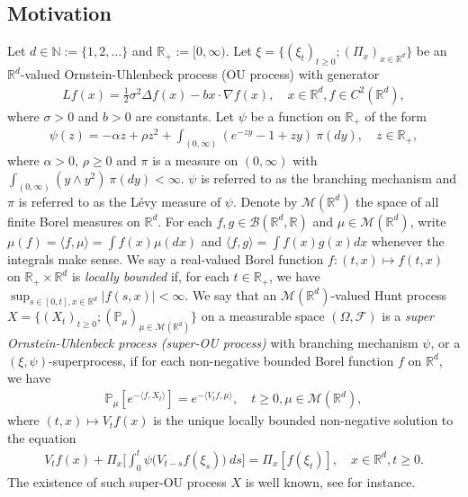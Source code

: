 \documentclass[12pt,a4paper]{amsart}
\theoremstyle{plain}
\theoremstyle{definition}
\numberwithin{equation}{section}
\begin{document}
\subsection{Motivation}
\label{subsec:M}
Let $d \in \mathbb N:= \{1,2,\dots\}$ and $\mathbb R_+:= [0,\infty)$.
Let $\xi=\{(\xi_t)_{t\geq 0}; (\Pi_x)_{x\in \mathbb R^d}\}$ be an $\mathbb R^d$-valued Ornstein-Uhlenbeck process (OU process) with generator
\begin{align}
  Lf(x)
  = \frac{1}{2}\sigma^2\Delta f(x)-b x \cdot \nabla f(x)
  , \quad  x\in \mathbb R^d, f \in C^2(\mathbb R^d),
\end{align}
where $\sigma > 0$ and $b > 0$ are constants.
Let $\psi$ be a function on $\mathbb R_+$ of the form
\begin{align}
  \label{eq: honogeneou branching mechanism}
  \psi(z)
  =- \alpha z + \rho z^2 + \int_{(0,\infty)} (e^{-zy} - 1 + zy)~\pi(dy)
  , \quad  z \in \mathbb R_+,
\end{align}
where $\alpha > 0 $, $\rho \geq0$ and $\pi$ is a measure on $(0,\infty)$ with $\int_{(0,\infty)}(y\wedge y^2)~\pi(dy)< \infty$.
$\psi$ is referred to as the branching mechanism and $\pi$ is referred to as the L\'evy measure of $\psi$.
Denote by $\mathcal M(\mathbb R^d)$ the space of all finite Borel measures on $\mathbb R^d$.
For each $f,g\in \mathcal B(\mathbb R^d, \mathbb R)$ and $\mu \in \mathcal M(\mathbb R^d)$, write $\mu(f)=\langle f,\mu\rangle = \int f(x)\mu(dx)$ and $\langle f, g\rangle = \int f(x)g(x) dx$ whenever the integrals make sense.
We say a real-valued Borel function $f:(t,x)\mapsto f(t,x)$ on $\mathbb R_+\times \mathbb R^d$ is \emph{locally bounded} if, for each $t\in \mathbb R_+$, we have $ \sup_{s\in [0,t],x\in \mathbb R^d} |f(s,x)|<\infty. $
We say that an $\mathcal M(\mathbb R^d)$-valued Hunt process $X = \{(X_t)_{t\geq 0}; (\mathbb{P}_{\mu})_{\mu \in \mathcal M(\mathbb R^d)}\}$ 
on a measurable space $(\Omega, \mathscr{F})$ 
is a \emph{super Ornstein-Uhlenbeck process (super-OU process)} with branching mechanism $\psi$, or a $(\xi, \psi)$-superprocess, if for each non-negative bounded Borel function $f$ on $\mathbb R^d$, we have
\begin{align}
  \label{eq: def of V_t}
  \mathbb{P}_{\mu}[e^{-\langle f,X_t \rangle}]
  = e^{-\langle V_tf, \mu \rangle}
  , \quad t\geq 0, \mu \in \mathcal M(\mathbb R^d),
\end{align}
where $(t,x) \mapsto V_tf(x)$ is the unique locally bounded non-negative solution to the equation
\begin{align}
  V_tf(x) + \Pi_x \Big[ \int_0^t\psi\big(V_{t-s}f(\xi_s)\big)~ds\Big]
	= \Pi_x [f(\xi_t)]
  , \quad x\in \mathbb R^d, t\geq 0.
\end{align}	
The existence of such super-OU process $X$ is well known, see \cite{Dynkin1993Superprocesses} for instance.
\end{document}
